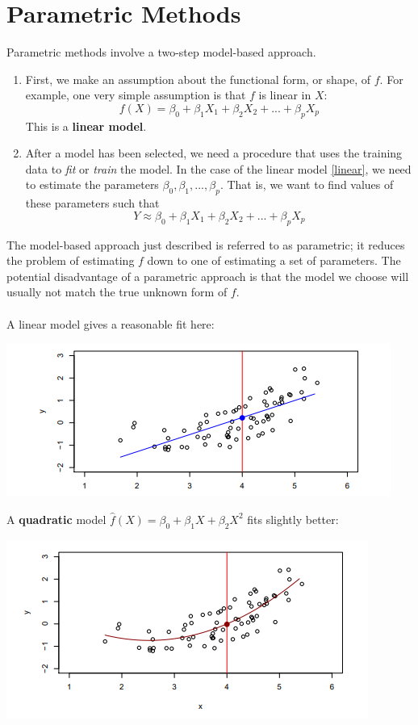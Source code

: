 \section{Parametric Methods}
Parametric methods involve a two-step model-based approach.
\begin{enumerate}
    \item First, we make an assumption about the functional form, or shape, of $f$. For example, one very simple assumption is that $f$ is linear in $X$: 
    \begin{equation}
        f(X) = \beta_0 + \beta_1 X_1 + \beta_2 X_2 + ... + \beta_p X_p
        \label{linear}
    \end{equation}
    This is a \textbf{linear model}.

    \item After a model has been selected, we need a procedure that uses the training data to \textit{fit} or \textit{train} the model. In the case of the linear model \ref{linear}, we need to estimate the parameters $\beta_0, \beta_1,...,\beta_p$. That is, we want to find values of these parameters such that
    \[Y \approx \beta_0 + \beta_1 X_1 + \beta_2 X_2 + ... + \beta_p X_p\]
\end{enumerate}
The model-based approach just described is referred to as parametric;
it reduces the problem of estimating $f$ down to one of estimating a set of parameters. The potential disadvantage of a parametric approach is that the model we choose will usually not match the true unknown form of $f$.\\\\
A linear model gives a reasonable fit here:
\begin{center}
    \includegraphics[]{images/linear.png}
\end{center}
A \textbf{quadratic} model $\hat{f}(X) = \beta_0 + \beta_1 X + \beta_2 X^2$ fits slightly better:
\begin{center}
    \includegraphics[]{images/quadratic.png}
\end{center}
